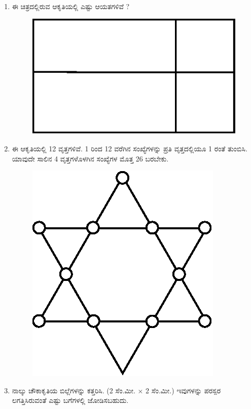 \begin{enumerate}
\item ಈ ಚಿತ್ರದಲ್ಲಿರುವ ಆಕೃತಿಯಲ್ಲಿ ಎಷ್ಟು ಆಯತಗಳಿವೆ ?
\begin{figure}[!ht]
\centering
\includegraphics[scale=.8]{images/chap1/fig3.eps}
\end{figure}

\item ಈ ಆಕೃತಿಯಲ್ಲಿ 12 ವೃತ್ತಗಳಿವೆ. 1 ರಿಂದ 12 ವರೆಗಿನ ಸಂಖ್ಯೆಗಳನ್ನು ಪ್ರತಿ ವೃತ್ತದಲ್ಲಿಯೂ 1 ರಂತೆ ತುಂಬಿಸಿ. ಯಾವುದೇ ಸಾಲಿನ 4 ವೃತ್ತಗಳೊಳಗಿನ ಸಂಖ್ಯೆಗಳ ಮೊತ್ತ 26 ಬರಬೇಕು.
\begin{figure}[!ht]
\centering
\includegraphics[scale=.8]{images/chap1/fig4.eps}
\end{figure}

\item ನಾಲ್ಕು ಚೌಕಾಕೃತಿಯ ಬಿಲ್ಲೆಗಳನ್ನು ಕತ್ತರಿಸಿ. (2 ಸೆಂ.ಮೀ. $\times$ 2 ಸೆಂ.ಮೀ.) ಇವುಗಳನ್ನು ಪರಸ್ಪರ ಲಗತ್ತಿಸಿರುವಂತೆ ಎಷ್ಟು ಬಗೆಗಳಲ್ಲಿ ಜೋಡಿಸಬಹುದು.


\end{enumerate}

